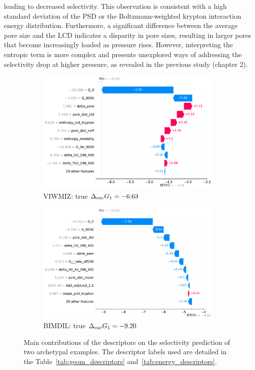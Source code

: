 \documentclass[main]{subfiles}
\begin{document}
leading to decreased selectivity. This observation is consistent with a high standard deviation of the PSD or the Boltzmann-weighted krypton interaction energy distribution. Furthermore, a significant difference between the average pore size and the LCD indicates a disparity in pore sizes, resulting in larger pores that become increasingly loaded as pressure rises. However, interpreting the entropic term is more complex and presents unexplored ways of addressing the selectivity drop at higher pressure, as revealed in the previous study (chapter 2).

\begin{figure}[ht]
    \centering
    \begin{subfigure}[b]{0.47\textwidth}
      \centering
      \includegraphics[width=\textwidth]{figures/4-ml/main/VIWMIZ_clean.pdf}
      \caption{VIWMIZ: true $\Delta_{\text{exc}} G_1=-6.63$}
    \end{subfigure}
         \hfill
    \begin{subfigure}[b]{0.47\textwidth}
      \centering
      \includegraphics[width=\textwidth]{figures/4-ml/main/BIMDIL_clean.pdf}
      \caption{BIMDIL: true $\Delta_{\text{exc}} G_1=-9.20$}
    \end{subfigure}
  \caption{Main contributions of the descriptors on the selectivity prediction of two archetypal examples. The descriptor labels used are detailed in the Table~\ref{tab:geom_descriptors} and~\ref{tab:energy_descriptors}.}\label{fgr:contribution}
\end{figure}
\end{document}
